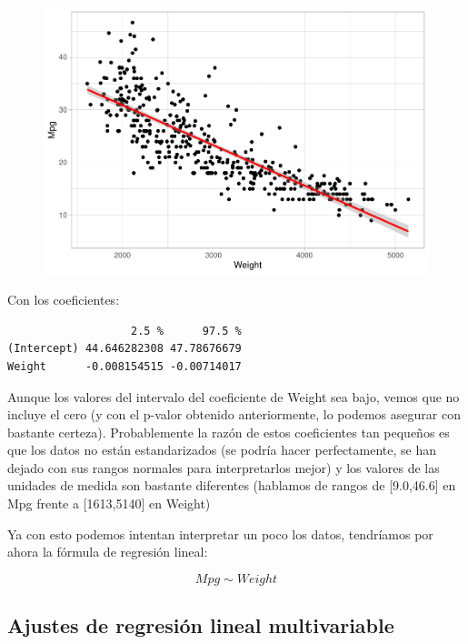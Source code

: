 \begin{figure}[H]\includegraphics[width=.9\linewidth]{img/Regresion_files/figure-latex/unnamed-chunk-6-1} \caption{}\end{figure}

Con los coeficientes:

\begin{verbatim}
                   2.5 %      97.5 %
(Intercept) 44.646282308 47.78676679
Weight      -0.008154515 -0.00714017
\end{verbatim}

Aunque los valores del intervalo del coeficiente de Weight sea bajo, vemos que no incluye el cero (y con el p-valor obtenido anteriormente, lo podemos asegurar con bastante certeza). Probablemente la razón de estos coeficientes tan pequeños es que los datos no están estandarizados (se podría hacer perfectamente, se han dejado con sus rangos normales para interpretarlos mejor) y los valores de las unidades de medida son bastante diferentes (hablamos de rangos de {[}9.0,46.6{]} en Mpg frente a {[}1613,5140{]} en Weight)

\vspace{\baselineskip}

Ya con esto podemos intentan interpretar un poco los datos, tendríamos por ahora la fórmula de regresión lineal: 

\begin{equation}    
    Mpg \sim Weight
\end{equation}

\subsection{Ajustes de regresión lineal multivariable}


